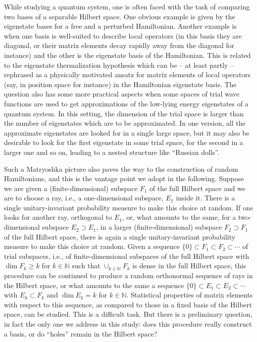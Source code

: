 \documentclass[pdftex]{sigma}%
\newcommand{\kN}{k\in \mathbb{N}}
\begin{document}
While studying a quantum system, one is often faced with the task of comparing two bases of a separable Hilbert space. One obvious example is given by the eigenstate bases for a free and a perturbed Hamiltonian. Another example is when one basis is well-suited to describe local operators (in this basis they are diagonal, or their matrix elements decay rapidly away from the diagonal for instance) and the other is the eigenstate basis of the Hamiltonian. This is related to the eigenstate thermalization hypothesis \cite{PhysRevA.43.2046,PhysRevE.50.888} which can be -- at least partly -- rephrased as a physically motivated ansatz for matrix elements of local operators (say, in position space for instance) in the Hamiltonian eigenstate basis. The question also has some more practical aspects when some spaces of trial wave functions are used to get approximations of the low-lying energy eigenstates of a quantum system. In this setting, the dimension of the trial space is larger than the number of eigenstates which are to be approximated. In one version, all the approximate eigenstates are looked for in a single large space, but it may also be desirable to look for the first eigenstate in some trial space, for the second in a larger one and so on, leading to a nested structure like ``Russian dolls''.

Such a Matryoshka picture also paves the way to the construction of random Hamiltonians, and this is the vantage point we adopt in the following. Suppose we are given a (finite-dimensional) subspace $F_1$ of the full Hilbert space and we are to choose a ray, i.e., a one-dimensional subspace, $E_1$ inside it. There is a single unitary-invariant probability measure to make this choice at random. If one looks for another ray, orthogonal to $E_1$, or, what amounts to the same, for a two-dimensional subspace $E_2 \supset E_1$, in a larger (finite-dimensional) subspace $F_2 \supset F_1$ of the full Hilbert space, there is again a single unitary-invariant probability measure to make this choice at random. Given a sequence $\{0\}\subset F_1\subset F_2\subset\cdots$ of trial subspaces, i.e., of finite-dimensional subspaces of the full Hilbert space with $\dim F_k \geq k$ for $\kN$ such that $\cup_{\kN} F_k$ is dense in the full Hilbert space, this procedure can be continued to produce a random orthonormal sequence of rays in the Hilbert space, or what amounts to the same a sequence $\{0\}\subset E_1\subset E_2\subset\cdots$ with $E_k\subset F_k$ and $\dim E_k = k$ for $\kN$. Statistical properties of matrix elements with respect to this sequence, as compared to those in a fixed basis of the Hilbert space, can be studied. This is a difficult task. But there is a preliminary question, in fact the only one we address in this study: does this procedure really construct a basis, or do ``holes'' remain in the Hilbert space?
\end{document}

